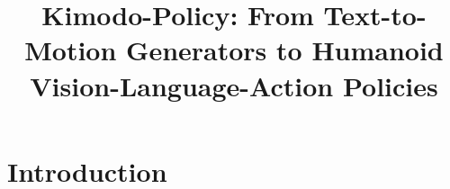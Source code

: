 \documentclass{article}
\title{Kimodo-Policy: From Text-to-Motion Generators to Humanoid Vision-Language-Action Policies}
\begin{document}
\maketitle



\clearpage

\section{Introduction}
\label{sec:introduction}




\clearpage
\end{document}
